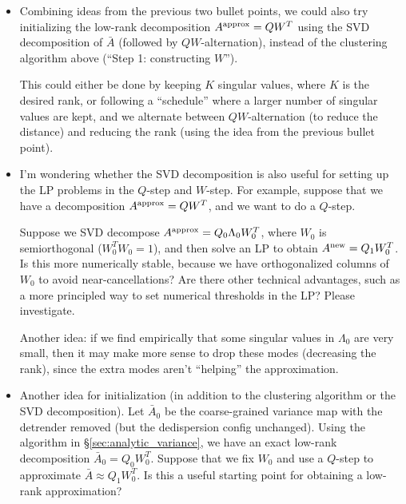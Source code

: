 \documentclass{article}
\numberwithin{equation}{section}   %
\begin{document}
\begin{itemize}
 Similarly, we could also keep $Q_1$ fixed and use the ``$W$-step'' to
 update $W_1$ -- I'm not sure which variant works better.

 Note that before trying this idea, you may need to remove unnecessary
 positivity constraints from the LP (see first bullet point above), since
 SVD modes have arbitrary signs.

\item Combining ideas from the previous two bullet points, we could also try 
 initializing the low-rank decomposition $A^{\rm approx} = Q W^T$ using the
 SVD decomposition of $\bar A$ (followed by $QW$-alternation), instead of the
 clustering algorithm above (``Step 1: constructing $W$'').

 This could either be done by keeping $K$ singular values, where $K$ is the
 desired rank, or following a ``schedule'' where a larger number of singular
 values are kept, and we alternate between $QW$-alternation (to reduce the
 distance) and reducing the rank (using the idea from the previous bullet point).

\item I'm wondering whether the SVD decomposition is also useful for setting
 up the LP problems in the $Q$-step and $W$-step. For example, suppose that
 we have a decomposition $A^{\rm approx} = Q W^T$, and we want to do a $Q$-step.

 Suppose we SVD decompose $A^{\rm approx} = Q_0 \Lambda_0 W_0^T$, where $W_0$
 is semiorthogonal ($W_0^T W_0 = 1$), and then solve an LP to obtain 
 $A^{\rm new} = Q_1 W_0^T$. Is this more numerically stable, because we
 have orthogonalized columns of $W_0$ to avoid near-cancellations? Are
 there other technical advantages, such as a more principled way to set
 numerical thresholds in the LP? Please investigate.
 
 Another idea: if we find empirically that some singular values in $\Lambda_0$ 
 are very small, then it may make more sense to drop these modes (decreasing the rank),
 since the extra modes aren't ``helping'' the approximation.

\item Another idea for initialization (in addition to the clustering algorithm or
 the SVD decomposition). Let $\bar A_0$ be the coarse-grained variance map with the
 detrender removed (but the dedispersion config unchanged). Using the algorithm in
 \S\ref{sec:analytic_variance}, we have an exact low-rank decomposition $\bar A_0 = Q_0 W_0^T$.
 Suppose that we fix $W_0$ and use a $Q$-step to approximate $\bar A \approx Q_1 W_0^T$.
 Is this a useful starting point for obtaining a low-rank approximation?


\end{itemize}
\end{document}
